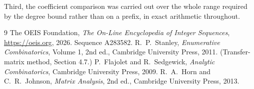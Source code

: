 \documentclass[11pt,a4paper]{article}
\theoremstyle{plain}
\theoremstyle{definition}
\begin{document}
Third, the coefficient comparison was carried out over the whole range required by the degree
bound rather than on a prefix, in exact arithmetic throughout.

\begin{thebibliography}{9}
 The OEIS Foundation, \emph{The On-Line Encyclopedia of Integer
Sequences}, \url{https://oeis.org}, 2026. Sequence A283582.
 R.~P.~Stanley, \emph{Enumerative Combinatorics}, Volume 1, 2nd ed.,
Cambridge University Press, 2011. (Transfer-matrix method, Section 4.7.)
 P.~Flajolet and R.~Sedgewick, \emph{Analytic Combinatorics}, Cambridge
University Press, 2009.
 R.~A.~Horn and C.~R.~Johnson, \emph{Matrix Analysis}, 2nd ed., Cambridge
University Press, 2013.
\end{thebibliography}
\end{document}
